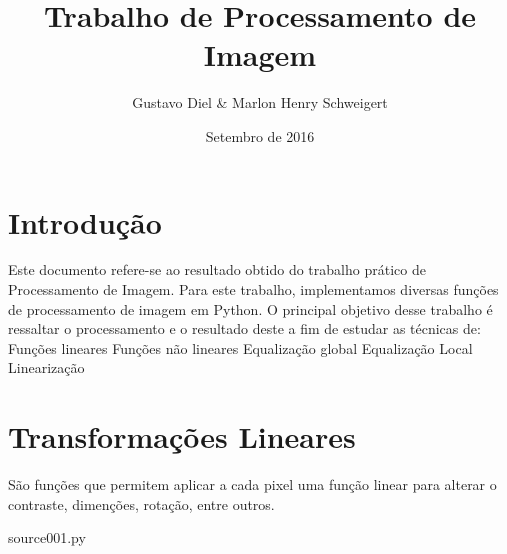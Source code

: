 \documentclass{article}
\title{Trabalho de Processamento de Imagem}
\author{Gustavo Diel & Marlon Henry Schweigert}
\date{Setembro de 2016}
\begin{document}
\maketitle

\section{Introdução}
Este documento refere-se ao resultado obtido do trabalho prático de Processamento de Imagem. 
Para este trabalho, implementamos diversas funções de processamento de imagem em Python. O principal objetivo desse trabalho é ressaltar o processamento e o resultado deste a fim de estudar as técnicas de:
Funções lineares
Funções não lineares
Equalização global
Equalização Local
Linearização

\newpage
\section{Transformações Lineares}

São funções que permitem aplicar a cada pixel uma função linear para alterar o contraste, dimenções, rotação, entre outros.


{source001.py}
\end{document}
